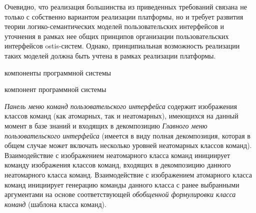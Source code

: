 Очевидно, что реализация большинства из приведенных требований связана не только с собственно вариантом реализации
платформы, но и требует развития теории логико-семантических моделей пользовательских интерфейсов и уточнения в
рамках нее общих принципов организации пользовательских интерфейсов ostis-систем. Однако, принципиальная возможность
реализации таких моделей должна быть учтена в рамках реализации платформы.

\begin{SCn}
\begin{scnrelfromlist}{компоненты программной системы}
    \begin{scnindent}
        \begin{scnrelfromlist}{компонент программной системы}
        \end{scnrelfromlist}
    \end{scnindent}
\end{scnrelfromlist}
\end{SCn}

\textit{Панель меню команд пользовательского интерфейса} содержит изображения классов команд (как атомарных, так и
неатомарных), имеющихся на данный момент в базе знаний и входящих в декомпозицию \textit{Главного меню пользовательского
интерфейса} (имеется в виду полная декомпозиция, которая в общем случае может включать несколько уровней неатомарных
классов команд). Взаимодействие с изображением неатомарного класса команд инициирует команду изображения классов
команд, входящих в декомпозицию данного неатомарного класса команд. Взаимодействие с изображением атомарного класса
команд инициирует генерацию команды данного класса с ранее выбранными аргументами на основе соответствующей
\textit{обобщенной формулировки класса команд} (шаблона класса команд).

